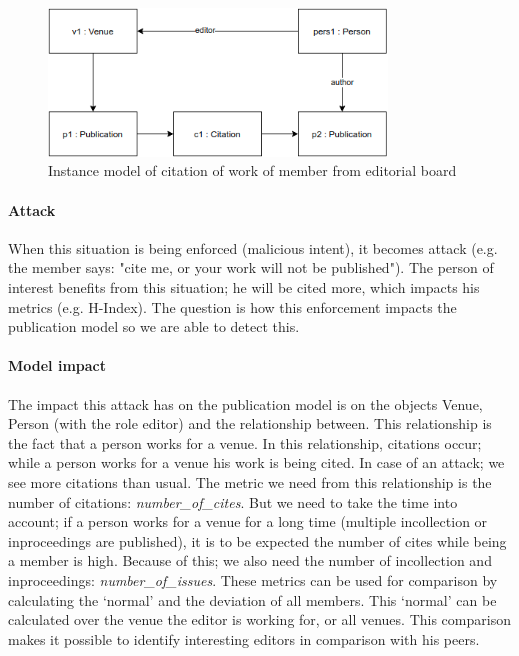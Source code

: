 \documentclass{ou-report}
\begin{document}
\begin{figure}[H]
\centering
\includegraphics[width=9cm]{images/cite_work_editorial_board.drawio.png}
\caption{Instance model of citation of work of member from editorial board}
\label{fig:cweb}
\end{figure}

\paragraph{Attack} When this situation is being enforced (malicious intent), it 
becomes attack (e.g. the member says: "cite me, or your work will not be 
published"). The person of interest benefits from this situation; he will be
cited more, which impacts his metrics (e.g. H-Index). The question is how this
enforcement impacts the publication model so we are able to detect this.

\paragraph{Model impact}
The impact this attack has on the publication model is on the objects Venue, 
Person (with the role editor) and the relationship between. This relationship is
the fact that a person works for a venue. In this relationship, citations occur;
while a person works for a venue his work is being cited. In case of an attack; 
we see more citations than usual. The metric we need from this 
relationship is the number of citations: \textit{number\_of\_cites}. But we need
to take the time into account; if a person works for a venue for a long time 
(multiple incollection or inproceedings are published), it is to be expected the
number of cites while being a member is high. Because of this; we also need the 
number of incollection and inproceedings: \textit{number\_of\_issues}.
These metrics can be used for comparison by calculating the `normal' and the 
deviation of all members. This `normal' can be calculated over the venue the 
editor is working for, or all venues. This comparison makes it possible to 
identify interesting editors in comparison with his peers.
\end{document}
